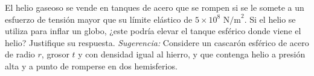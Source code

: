 \item El helio gaseoso se vende en tanques de acero que se rompen si se le somete a un esfuerzo de tensión mayor que su límite elástico de $5 \times 10^8\text{ N/m}^2$. Si el helio se utiliza para inflar un globo, ¿este podría elevar el tanque esférico donde viene el helio? Justifique su respuesta. 
\textit{Sugerencia:} Considere un cascarón esférico de acero de radio $r$, grosor $t$ y con densidad igual al hierro, y que contenga helio a presión alta y a punto de romperse en dos hemisferios.
